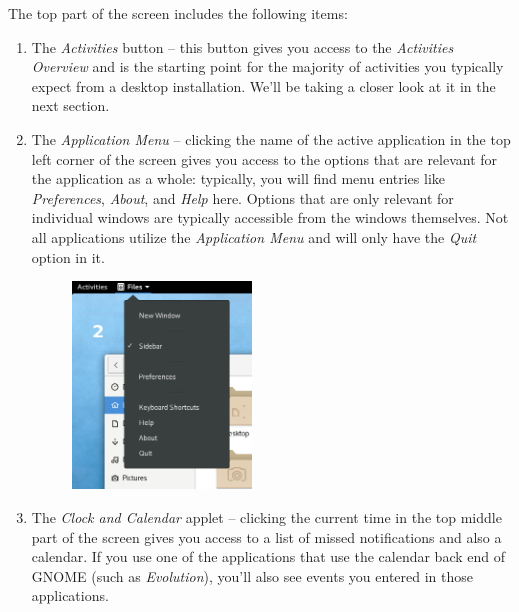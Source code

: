The top part of the screen includes the following items:
\begin{enumerate}
\item The \emph{Activities} button -- this button gives you access to the \emph{Activities Overview} and is the starting point for the majority of activities you typically expect from a desktop installation. We'll be taking a closer look at it in the next section.

\item The \emph{Application Menu} -- clicking the name of the active application in the top left corner of the screen gives you access to the options that are relevant for the application as a whole: typically, you will find menu entries like \emph{Preferences}, \emph{About}, and \emph{Help} here. Options that are only relevant for individual windows are typically accessible from the windows themselves. Not all applications utilize the \emph{Application Menu} and will only have the \emph{Quit} option in it.

\begin{figure}[ht]
\begin{center}
\includegraphics[width=0.45\textwidth]{img/app-menu}
 \label{fig:app-menu}
\end{center}
\end{figure}

\item The \emph{Clock and Calendar} applet -- clicking the current time in the top middle part of the screen gives you access to a list of missed notifications and also a calendar. If you use one of the applications that use the calendar back end of GNOME (such as \emph{Evolution}), you'll also see events you entered in those applications.


\end{enumerate}
